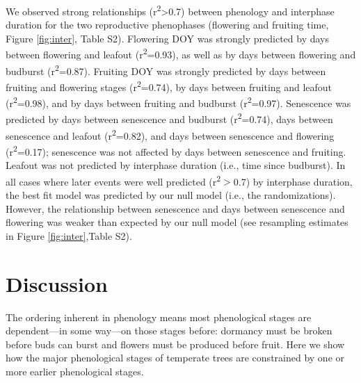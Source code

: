 \documentclass{article}
\begin{document}
\par We observed strong relationships (r\textsuperscript{2}>0.7) between phenology and interphase duration for the two reproductive phenophases (flowering and fruiting time, Figure \ref{fig:inter}, Table S2). Flowering DOY was strongly predicted by days between flowering and leafout (r\textsuperscript{2}=0.93), as well as by days between flowering and budburst (r\textsuperscript{2}=0.87). Fruiting DOY was strongly predicted by days between fruiting and flowering stages (r\textsuperscript{2}=0.74), by days between fruiting and leafout (r\textsuperscript{2}=0.98), and by days between fruiting and budburst (r\textsuperscript{2}=0.97). Senescence was predicted by days between senescence and budburst (r\textsuperscript{2}=0.74), days between senescence and leafout (r\textsuperscript{2}=0.82), and days between senescence and flowering (r\textsuperscript{2}=0.17); senescence was not affected by days between senescence and fruiting.  Leafout was not predicted by interphase duration (i.e., time since budburst). In all cases where later events were well predicted (r\textsuperscript{2}$>$0.7) by interphase duration, the best fit model was predicted by our null model (i.e., the randomizations).  However, the relationship between senescence and days between senescence and flowering was weaker than expected by our null model (see resampling estimates in Figure \ref{fig:inter},Table S2).

\section* {Discussion}
\par The ordering inherent in phenology means most phenological stages are dependent---in some way---on those stages before: dormancy must be broken before buds can burst and flowers must be produced before fruit. Here we show how the major phenological stages of temperate trees are constrained by one or more earlier phenological stages. 
\end{document}
